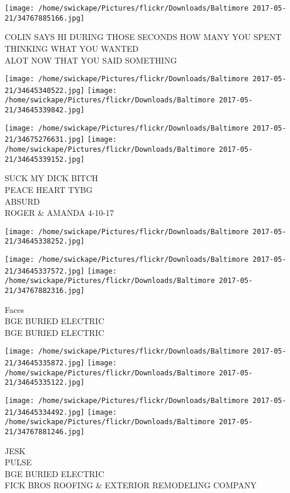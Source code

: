 \documentclass[10pt,letterpaper]{article}
\begin{document}
\vspace{0.25in}
\texttt{[image: /home/swickape/Pictures/flickr/Downloads/Baltimore 2017-05-21/34767885166.jpg]}

COLIN SAYS HI DURING THOSE SECONDS HOW MANY YOU SPENT THINKING WHAT YOU WANTED\\
ALOT NOW THAT YOU SAID SOMETHING\\
\pagebreak

\texttt{[image: /home/swickape/Pictures/flickr/Downloads/Baltimore 2017-05-21/34645340522.jpg]}
\texttt{[image: /home/swickape/Pictures/flickr/Downloads/Baltimore 2017-05-21/34645339842.jpg]}

\texttt{[image: /home/swickape/Pictures/flickr/Downloads/Baltimore 2017-05-21/34675276631.jpg]}
\texttt{[image: /home/swickape/Pictures/flickr/Downloads/Baltimore 2017-05-21/34645339152.jpg]}

SUCK MY DICK BITCH\\
PEACE HEART TYBG\\
ABSURD\\
ROGER \& AMANDA 4{-}10{-}17\\
\pagebreak

\texttt{[image: /home/swickape/Pictures/flickr/Downloads/Baltimore 2017-05-21/34645338252.jpg]}

\vspace{0.25in}
\texttt{[image: /home/swickape/Pictures/flickr/Downloads/Baltimore 2017-05-21/34645337572.jpg]}
\texttt{[image: /home/swickape/Pictures/flickr/Downloads/Baltimore 2017-05-21/34767882316.jpg]}

Faces\\
BGE BURIED ELECTRIC\\
BGE BURIED ELECTRIC\\
\pagebreak

\texttt{[image: /home/swickape/Pictures/flickr/Downloads/Baltimore 2017-05-21/34645335872.jpg]}
\texttt{[image: /home/swickape/Pictures/flickr/Downloads/Baltimore 2017-05-21/34645335122.jpg]}

\texttt{[image: /home/swickape/Pictures/flickr/Downloads/Baltimore 2017-05-21/34645334492.jpg]}
\texttt{[image: /home/swickape/Pictures/flickr/Downloads/Baltimore 2017-05-21/34767881246.jpg]}

JESK\\
PULSE\\
BGE BURIED ELECTRIC\\
FICK BROS ROOFING \& EXTERIOR REMODELING COMPANY\\
\pagebreak
\end{document}
